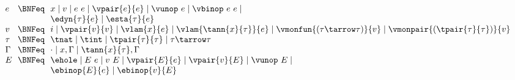 \begin{flushleft}

\begin{minipage}[t]{\columnwidth}
\\
$\begin{array}{l@{~~}c@{~~}l}
  e & \BNFeq & x \mid v \mid e~e \mid \vpair{e}{e} \mid \vunop~e \mid \vbinop~e~e \mid
\\ & & \edyn{\tau}{e} \mid \esta{\tau}{e}
\\
  v & \BNFeq & i \mid \vpair{v}{v} \mid \vlam{x}{e} \mid \vlam{\tann{x}{\tau}}{e} \mid \vmonfun{(\tau\tarrow\tau)}{v}
 \mid \vmonpair{(\tpair{\tau}{\tau})}{v}
\\
  \tau & \BNFeq & \tnat \mid \tint \mid \tpair{\tau}{\tau} \mid \tau \tarrow \tau
\\
  \Gamma & \BNFeq & \cdot \mid x,\Gamma \mid \tann{x}{\tau},\Gamma
\\
  E & \BNFeq & \ehole \mid E~e \mid v~E \mid
                  \vpair{E}{e} \mid \vpair{v}{E} \mid \vunop~E \mid
\\ & &            \ebinop{E}{e} \mid \ebinop{v}{E}
\end{array}$

\smallskip
{}\\
\begin{mathpar}









\end{mathpar}


\end{minipage}
\end{flushleft}
